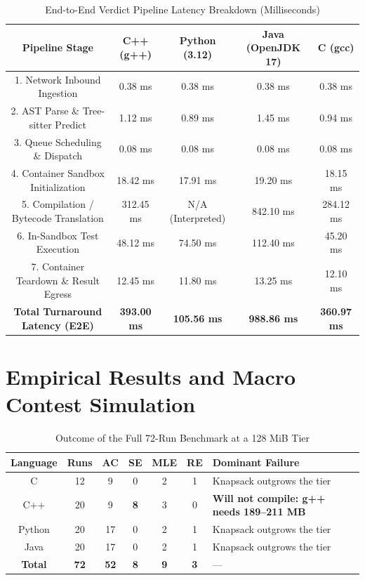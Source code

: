 \documentclass[conference]{IEEEtran}
\begin{document}
\begin{table}[htbp]
\caption{End-to-End Verdict Pipeline Latency Breakdown (Milliseconds)}
\label{tab:e2e_latency}
\begin{center}
\begin{tabular}{|c|c|c|c|c|}
\hline
\textbf{Pipeline Stage} & \textbf{C++ (g++)} & \textbf{Python (3.12)} & \textbf{Java (OpenJDK 17)} & \textbf{C (gcc)} \\
\hline
1. Network Inbound Ingestion & 0.38 ms & 0.38 ms & 0.38 ms & 0.38 ms \\
\hline
2. AST Parse \& Tree-sitter Predict & 1.12 ms & 0.89 ms & 1.45 ms & 0.94 ms \\
\hline
3. Queue Scheduling \& Dispatch & 0.08 ms & 0.08 ms & 0.08 ms & 0.08 ms \\
\hline
4. Container Sandbox Initialization & 18.42 ms & 17.91 ms & 19.20 ms & 18.15 ms \\
\hline
5. Compilation / Bytecode Translation & 312.45 ms & N/A (Interpreted) & 842.10 ms & 284.12 ms \\
\hline
6. In-Sandbox Test Execution & 48.12 ms & 74.50 ms & 112.40 ms & 45.20 ms \\
\hline
7. Container Teardown \& Result Egress & 12.45 ms & 11.80 ms & 13.25 ms & 12.10 ms \\
\hline
\textbf{Total Turnaround Latency (E2E)} & \textbf{393.00 ms} & \textbf{105.56 ms} & \textbf{988.86 ms} & \textbf{360.97 ms} \\
\hline
\end{tabular}
\end{center}
\end{table}

\section{Empirical Results and Macro Contest Simulation}

\begin{table}[!t]
\caption{Outcome of the Full 72-Run Benchmark at a 128 MiB Tier}
\label{tab:128mb_boundary}
\centering
\small
\begin{tabularx}{\textwidth}{|c|c|c|c|c|c|Y|}
\hline
\textbf{Language} & \textbf{Runs} & \textbf{AC} & \textbf{SE} & \textbf{MLE} & \textbf{RE} & \textbf{Dominant Failure} \\
\hline
C & 12 & 9 & 0 & 2 & 1 & Knapsack outgrows the tier \\
\hline
C++ & 20 & 9 & \textbf{8} & 3 & 0 & \textbf{Will not compile: g++ needs 189--211 MB} \\
\hline
Python & 20 & 17 & 0 & 2 & 1 & Knapsack outgrows the tier \\
\hline
Java & 20 & 17 & 0 & 2 & 1 & Knapsack outgrows the tier \\
\hline
\textbf{Total} & \textbf{72} & \textbf{52} & \textbf{8} & \textbf{9} & \textbf{3} & --- \\
\hline
\end{tabularx}
\end{table}
\end{document}
